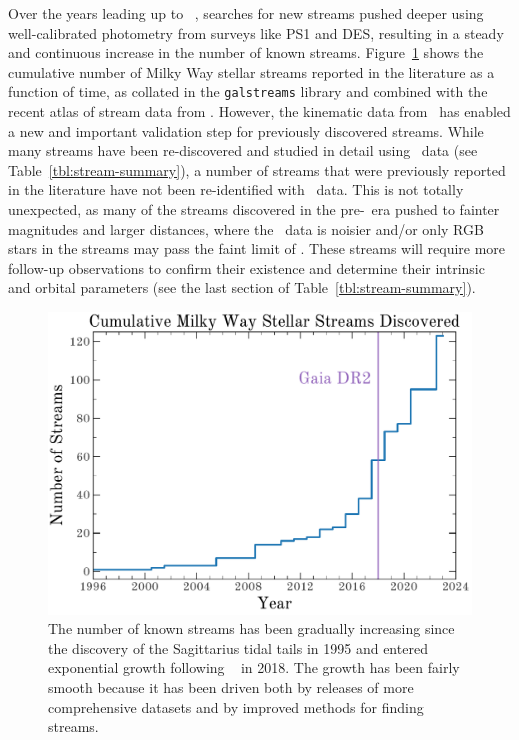 \documentclass[final,5p,times,twocolumn,authoryear]{elsarticle}
\begin{document}
Over the years leading up to \gaia\ , searches for new streams pushed deeper using
well-calibrated photometry from surveys like PS1 and DES, resulting in a steady and
continuous increase in the number of known streams.
Figure~\ref{fig:num-streams} shows the cumulative number of Milky Way stellar streams
reported in the literature as a function of time, as collated in the \texttt{galstreams}
\citep{mateu:2023} library and combined with the recent atlas of stream data from
\citet{ibata:2023}.
However, the kinematic data from \gaia\ has enabled a new and important validation step
for previously discovered streams.
While many streams have been re-discovered and studied in detail using \gaia\ data (see
Table~\ref{tbl:stream-summary}), a number of streams that were previously reported in
the literature have not been re-identified with \gaia\ data.
This is not totally unexpected, as many of the streams discovered in the pre-\gaia\ era
pushed to fainter magnitudes and larger distances, where the \gaia\ data is noisier
and/or only RGB stars in the streams may pass the faint limit of \gaia.
These streams will require more follow-up observations to confirm their existence and
determine their intrinsic and orbital parameters (see the last section of
Table~\ref{tbl:stream-summary}).

\begin{figure}[t!]
\begin{center}
\includegraphics[width=\columnwidth]{cumulative-num-streams.pdf}
\end{center}
\caption{%
The number of known streams has been gradually increasing since the discovery of the Sagittarius tidal tails in 1995 and entered exponential growth following \gaia\  in 2018.
The growth has been fairly smooth because it has been driven both by releases of more comprehensive datasets and by improved methods for finding streams.
}
\label{fig:num-streams}
\end{figure}
\end{document}
